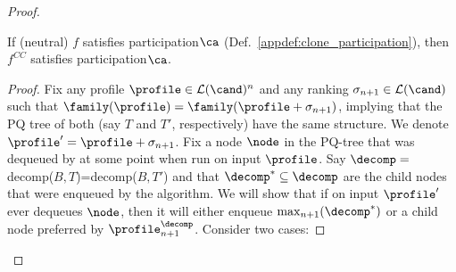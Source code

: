 \begin{proof}
\begin{lemma}
If (neutral) $f$ satisfies participation$\ca$ (Def.~\ref{appdef:clone_participation}), then $f^{CC}$ satisfies participation$\ca$.
\end{lemma}

\begin{proof}

    Fix any profile $\profile \in \mathcal{L}(\cand)^n$ and any ranking $\sigma_{n+1} \in\mathcal{L}(\cand) $ such that $\family(\profile)=\family(\profile+\sigma_{n+1})$, implying that the PQ tree of both (say $T$ and $T'$, respectively) have the same structure. We denote $\profile'=\profile+\sigma_{n+1}$. Fix a node $\node$ in the PQ-tree that was dequeued by  at some point when run on input $\profile$. Say $\decomp=$ decomp($B,T$)=decomp($B,T'$) and that $\decomp^* \subseteq \decomp$ are the child nodes that were enqueued by the algorithm. We will show that if  on input $\profile'$ ever dequeues $\node$, then it will either enqueue $\max_{n+1}(\decomp^*)$ or a child node preferred by $\profile^\decomp_{n+1}$. Consider two cases:
    

\end{proof}
\end{proof}
